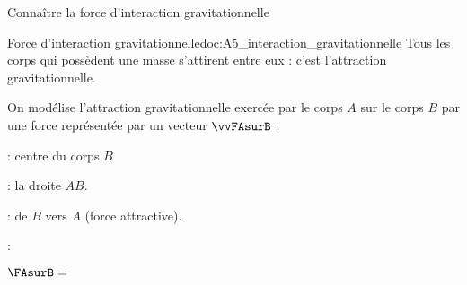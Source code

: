 \teteSndMouv

\nomPrenomClasse




\begin{objectifs}
  \item Connaître la force d'interaction gravitationnelle
\end{objectifs}




\begin{doc}{Force d'interaction gravitationnelle}{doc:A5_interaction_gravitationnelle}
  \chevron Tous les corps qui possèdent une masse s’attirent entre eux : c’est l’attraction gravitationnelle.

  \begin{importants}
    On modélise l'attraction gravitationnelle exercée par le corps $A$ sur le corps $B$ par une force représentée par un vecteur $\vvFAsurB$ :
    
    \vspace*{-12pt}
    \begin{wrapfigure}[6]{r}{0.4\linewidth}
      \vspace*{-20pt}
    \end{wrapfigure}

    \phantom{b}
    \begin{listePoints}
      \item {} : centre du corps $B$
      \item {} : la droite $AB$.
      \item {} : de $B$ vers $A$ (force attractive).
      \item {} : 
    \end{listePoints}
    \begin{center}
      $\FAsurB =$ 
    \end{center}
      

\end{importants}
\end{doc}

